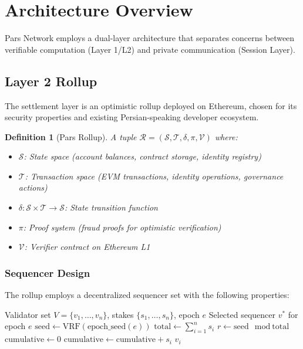 \documentclass[11pt,a4paper]{article}
\newtheorem{definition}{Definition}
\begin{document}
\section{Architecture Overview}
\label{sec:architecture}

Pars Network employs a dual-layer architecture that separates concerns between verifiable computation (Layer 1/L2) and private communication (Session Layer).

\subsection{Layer 2 Rollup}

The settlement layer is an optimistic rollup deployed on Ethereum, chosen for its security properties and existing Persian-speaking developer ecosystem.

\begin{definition}[Pars Rollup]
A tuple $\mathcal{R} = (\mathcal{S}, \mathcal{T}, \delta, \pi, \mathcal{V})$ where:
\begin{itemize}
    \item $\mathcal{S}$: State space (account balances, contract storage, identity registry)
    \item $\mathcal{T}$: Transaction space (EVM transactions, identity operations, governance actions)
    \item $\delta: \mathcal{S} \times \mathcal{T} \rightarrow \mathcal{S}$: State transition function
    \item $\pi$: Proof system (fraud proofs for optimistic verification)
    \item $\mathcal{V}$: Verifier contract on Ethereum L1
\end{itemize}
\end{definition}

\subsubsection{Sequencer Design}

The rollup employs a decentralized sequencer set with the following properties:

\begin{algorithm}[H]
\caption{Decentralized Sequencer Selection}
\label{alg:sequencer}
\begin{algorithmic}[1]
\Require Validator set $V = \{v_1, \ldots, v_n\}$, stakes $\{s_1, \ldots, s_n\}$, epoch $e$
\Ensure Selected sequencer $v^*$ for epoch $e$
\State $\text{seed} \gets \text{VRF}(\text{epoch\_seed}(e))$
\State $\text{total} \gets \sum_{i=1}^{n} s_i$
\State $r \gets \text{seed} \mod \text{total}$
\State $\text{cumulative} \gets 0$
    \State $\text{cumulative} \gets \text{cumulative} + s_i$
        \State \Return $v_i$
    \EndIf
\EndFor
\end{algorithmic}
\end{algorithm}
\end{document}
